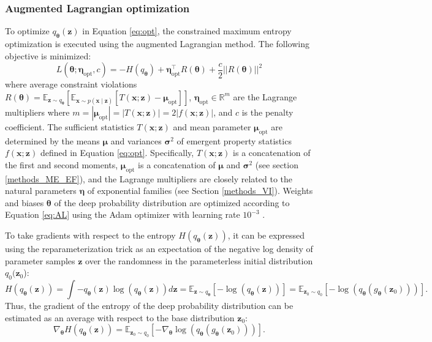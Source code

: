 \documentclass[11pt]{article}
\begin{document}
\subsubsection{Augmented Lagrangian optimization}\label{methods_AL_opt}
To optimize $q_{\bm{\theta}}(\mathbf{z})$ in Equation \ref{eq:opt}, the constrained maximum entropy optimization is executed using the augmented Lagrangian method.  
The following objective is minimized:
\begin{equation} \label{eq:AL}
L(\bm{\theta}; \bm{\eta}_{\text{opt}}, c) = -H(q_{\bm{\theta}}) + \bm{\eta}_{\text{opt}}^\top R(\bm{\theta}) + \frac{c}{2}||R(\bm{\theta})||^2
\end{equation}
where average constraint violations $R(\bm{\theta}) = \mathbb{E}_{\mathbf{z} \sim q_{\bm{\theta}}}\left[ \mathbb{E}_{\mathbf{x}\sim p(\mathbf{x} \mid \mathbf{z})}\left[T(\mathbf{x}; \mathbf{z}) - \bm{\mu}_{\text{opt}} \right] \right]$, $\bm{\eta}_{\text{opt}} \in \mathbb{R}^m$ are the Lagrange multipliers where $m = |\bm{\mu}_{\text{opt}}| = |T(\mathbf{x}; \mathbf{z})| = 2|f(\mathbf{x}; \mathbf{z})|$,  and $c$ is the penalty coefficient. 
The sufficient statistics $T(\mathbf{x}; \mathbf{z})$ and mean parameter $\bm{\mu}_{\text{opt}}$ are determined by the means $\bm{\mu}$ and variances $\bm{\sigma}^2$ of emergent property statistics $f(\mathbf{x}; \mathbf{z})$ defined in Equation \ref{eq:opt}.
Specifically, $T(\mathbf{x}; \mathbf{z})$ is a concatenation of the first and second moments, $\bm{\mu}_{\text{opt}}$ is a concatenation of $\bm{\mu}$ and $\bm{\sigma}^2$ (see section \ref{methods_ME_EF}), and the Lagrange multipliers are closely related to the natural parameters $\bm{\eta}$ of exponential families (see Section \ref{methods_VI}).
Weights and biases $\bm{\theta}$ of the deep probability distribution are optimized according to Equation \ref{eq:AL} using the Adam optimizer with learning rate $10^{-3}$ \cite{kingma2014adam}.

To take gradients with respect to the entropy $H(q_{\bm{\theta}}(\mathbf{z}))$, it can be expressed using the reparameterization trick as an expectation of the negative log density of parameter samples $\mathbf{z}$ over the randomness in the parameterless initial distribution $q_0(\mathbf{z}_0$):
\begin{equation}
H(q_{\bm{\theta}}(\mathbf{z})) = \int - q_{\bm{\theta}}(\mathbf{z}) \log(q_{\bm{\theta}}(\mathbf{z})) d\mathbf{z} = \mathbb{E}_{\mathbf{z} \sim q_{\bm{\theta}}}\left[-\log(q_{\bm{\theta}}(\mathbf{z})) \right] = \mathbb{E}_{\mathbf{z}_0 \sim q_0}\left[-\log(q_{\bm{\theta}}(g_{\bm{\theta}}(\mathbf{z}_0))) \right].
\end{equation}
Thus, the gradient of the entropy of the deep probability distribution can be estimated as an average with respect to the base distribution $\mathbf{z}_0$:
\begin{equation}
\nabla_{\bm{\theta}} H(q_{\bm{\theta}}(\mathbf{z})) = \mathbb{E}_{\mathbf{z}_0 \sim q_0}\left[- \nabla_{\bm{\theta}} \log(q_{\bm{\theta}}(g_{\bm{\theta}}(\mathbf{z}_0))) \right].
\end{equation}
\end{document}
